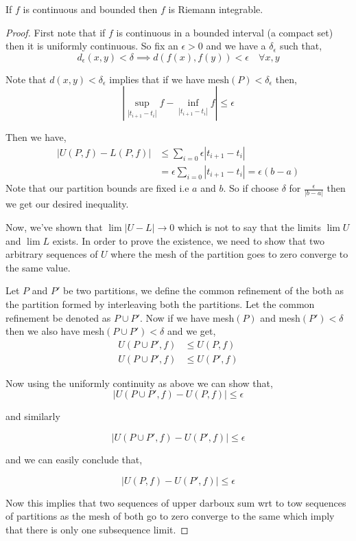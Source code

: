 \begin{theorem}
    If $f$ is continuous and bounded then $f$ is Riemann integrable.
\end{theorem}
\begin{proof}
    First note that if $f$ is continuous in a bounded interval (a compact set) then it is uniformly continuous. So fix an $\epsilon > 0$  and we have a $\delta_{\epsilon}$ such that,
    \[
        d_{\epsilon}(x, y) < \delta \implies d(f(x), f(y)) < \epsilon  \quad \forall x, y
    \]

    Note that $d(x, y) < \delta_{\epsilon}$ implies that if we have $\text{mesh} (P) < \delta_{\epsilon}$ then,
    \[
        |\sup_{|t_{i + 1} -t_i|} f - \inf_{|t_{i + 1} -t_i|} f|  \le \epsilon
    \]

    Then we have, 
    \begin{align*}
        |U(P, f) - L(P, f)| &\le \sum_{i = 0} \epsilon |t_{i + 1} - t_i|\\
                            &= \epsilon \sum_{i = 0} |t_{i + 1} - t_i| = \epsilon (b - a)
    \end{align*}
    Note that our partition bounds are fixed i.e $a$ and $b$. So if choose $\delta$ for $\frac{\epsilon}{|b - a|}$ then we get our desired inequality.

    \vspace{1em}
    
    Now, we've shown that $\lim |U - L| \to 0$ which is not to say that the limits $\lim U$ and $\lim L$ exists. In order to prove the existence, we need to show that two arbitrary sequences of $U$ where the mesh of the partition goes to zero converge to the same value. 

    \vspace{1em}

    Let $P$ and $P'$ be two partitions, we define the common refinement of the both as the partition formed by interleaving both the partitions. Let the common refinement be denoted as $P \cup P'$. Now if we have mesh$(P)$ and mesh$(P') < \delta$  then we also have mesh$(P \cup P') < \delta$ and we get, 
    \begin{align*}
        U(P \cup P', f) &\le U (P, f)\\
        U(P \cup P', f) &\le U (P', f)
    \end{align*}
    
    Now using the uniformly continuity as above we can show that, 
    \[
        |U(P \cup P', f) - U (P, f)| \le \epsilon
    \]

    and similarly 

    \[
        |U(P \cup P', f) - U (P', f)| \le \epsilon
    \]

    and we can easily conclude that, 

    \[
        |U(P, f) - U (P', f)| \le \epsilon
    \]

    Now this implies that two sequences of upper darboux sum wrt to tow sequences of partitions as the mesh of both go to zero converge to the same which imply that there is only one subsequence limit.

\end{proof}
